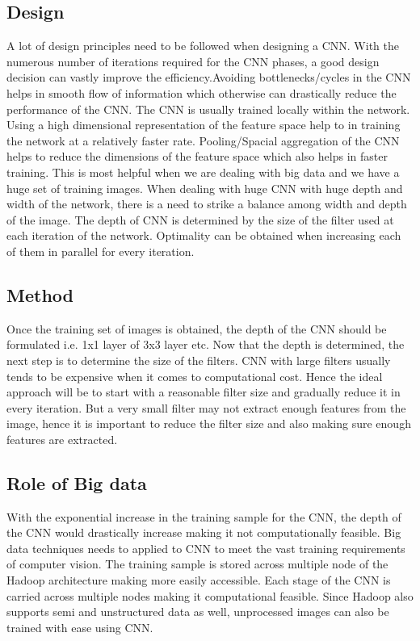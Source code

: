 \documentclass[sigconf]{acmart}
\begin{document}
\subsection{Design}
A lot of design principles need to be followed when designing a CNN. With the numerous number of iterations required for the CNN phases, a good design decision can vastly improve the efficiency.Avoiding bottlenecks/cycles in the CNN helps in smooth flow of information which otherwise can drastically reduce the performance of the CNN. The CNN is usually trained locally within the network. Using a high dimensional representation of the feature space help to in training the network at a relatively faster rate. Pooling/Spacial aggregation of the CNN helps to reduce the dimensions of the feature space which also helps in faster training. This is most helpful when we are dealing with big data and we have a huge set of training images. When dealing with huge CNN with huge depth and width of the network, there is a need to strike a balance among width and depth of the image. The depth of CNN is determined by the size of the filter used at each iteration of the network. Optimality can be obtained when increasing each of them in parallel for every iteration.\cite{Christian}

\subsection{Method}
Once the training set of images is obtained, the depth of the CNN should be formulated i.e. 1x1 layer of 3x3 layer etc. Now that the depth is determined, the next step is to determine the size of the filters. CNN with large filters usually tends to be expensive when it comes to computational cost. Hence the ideal approach will be to start with a reasonable filter size and gradually reduce it in every iteration. But a very small filter may not extract enough features from the image, hence it is important to reduce the filter size and also making sure enough features are extracted.\cite{Christian}

\subsection{Role of Big data}
With the exponential increase in the training sample for the CNN, the depth of the CNN would drastically increase making it not computationally feasible. Big data techniques needs to applied to CNN to meet the vast training requirements of computer vision. The training sample is stored across multiple node of the Hadoop architecture making more easily accessible. Each stage of the CNN is carried across multiple nodes making it computational feasible. Since Hadoop also supports semi and unstructured data as well, unprocessed images can also be trained with ease using CNN.\cite{Christian}
\end{document}
